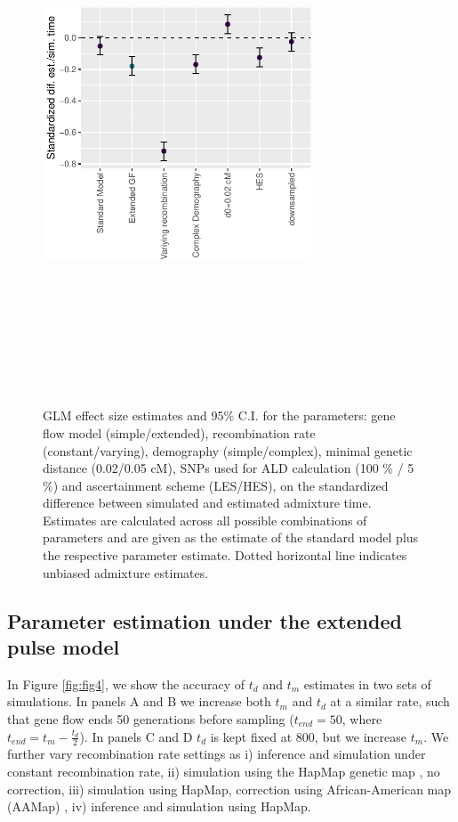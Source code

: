 \documentclass[11pt]{article}
\begin{document}
\begin{figure}
\centering
\includegraphics[width=8cm,height=16cm,keepaspectratio]{ATE_Revisions_files/figure-latex/fig3_1-1.pdf}
\caption{\label{fig:fig3} GLM effect size estimates and 95\% C.I. for the parameters: gene flow model (simple/extended), recombination rate (constant/varying), demography (simple/complex), minimal genetic distance (0.02/0.05 cM), SNPs used for ALD calculation (100 \% / 5 \%) and ascertainment scheme (LES/HES), on the standardized difference between simulated and estimated admixture time. Estimates are calculated across all possible combinations of parameters and are given as the estimate of the standard model plus the respective parameter estimate. Dotted horizontal line indicates unbiased admixture estimates.}
\end{figure}


\subsection{Parameter estimation under the extended pulse model}\label{estimating the Lomax-parameters under different conditions}
In Figure \ref{fig:fig4}, we show the accuracy of $t_d$ and $t_m$ estimates in two sets of simulations. In panels A and B we increase both $t_m$ and $t_d$ at a similar rate, such that gene flow ends 50 generations before sampling ($t_{end}=50$, where $t_{end}= t_m - \frac{t_d}{2}$). In panels C and D $t_d$ is kept fixed at 800, but we increase $t_m$. We further vary recombination rate settings as i) inference and simulation under constant recombination rate, ii) simulation using the HapMap genetic map \citep{HapMapConsortium_second_2007}, no correction, iii) simulation using HapMap, correction using African-American map (AAMap) \citep{hinch_landscape_2011}, iv) inference and simulation using HapMap. 
\end{document}
